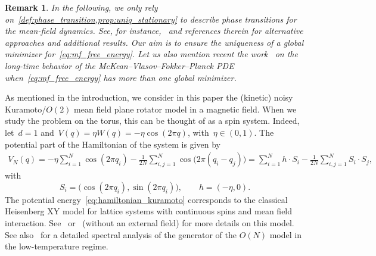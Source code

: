 \documentclass[onefignum,onetabnum]{siamart251216} %
\theoremstyle{plain}
\newtheorem{remark}[theorem]{Remark}
\numberwithin{equation}{section}
\numberwithin{theorem}{section}
\begin{document}
\begin{remark}
    In the following, we only rely on~\cref{def:phase_transition,prop:uniq_stationary} to describe phase transitions for the mean-field dynamics. See, for instance,~\cite{carrillo2020long,delgadino2023phase} and references therein for alternative approaches and additional results. Our aim is to ensure the uniqueness of a global minimizer for~\eqref{eq:mf_free_energy}. Let us also mention recent the work~\cite[Section 4]{monmarche2024local} on the long-time behavior of the McKean--Vlasov--Fokker--Planck PDE when~\eqref{eq:mf_free_energy} has more than one global minimizer.
\end{remark}

As mentioned in the introduction, we consider in this paper the (kinetic) noisy Kuramoto/$O(2)$ mean field plane rotator model in a magnetic field. When we study the problem on the torus, this can be thought of as a spin system. Indeed, let~$d = 1$ and~$V(q) = \eta W(q) = -\eta \cos(2\pi q)$, with~$\eta \in (0,1)$. The potential part of the Hamiltonian of the system is given by
\begin{align}
    \label{eq:hamiltonian_kuramoto}
V_N(q) = -\eta \sum_{i=1}^N \cos(2\pi q_i) -\frac{1}{2N}\sum_{i,j=1}^N \cos\bigl(2\pi(q_i - q_j)\bigr) = \sum_{i=1}^N h\cdot S_i -\frac{1}{2N}\sum_{i,j=1}^N S_i\cdot S_j,
\end{align}
with
\[
S_i = \bigl(\cos(2\pi q_i),\sin(2\pi q_i)\bigr),\qquad h = (-\eta,0).
\]
The potential energy~\eqref{eq:hamiltonian_kuramoto} corresponds to the classical Heisenberg XY
model for lattice systems with continuous spins and mean field interaction. See~\cite[Chapter 9]{friedli2017statistical} or~\cite{bertini2010dynamical} (without an external field) for more details on this model. See also~\cite{BeMe_2020} for a detailed spectral analysis of the generator of the $O(N)$ model in the low-temperature regime.
\end{document}
